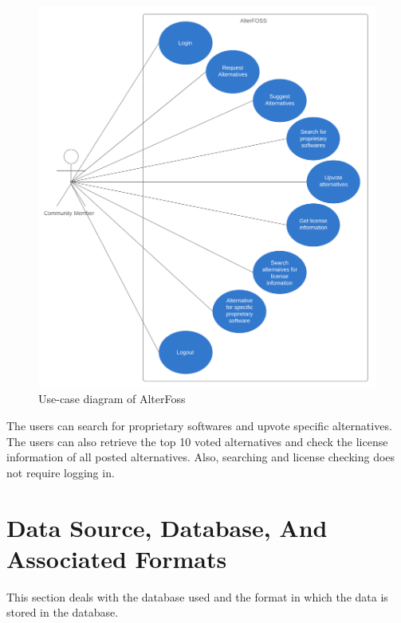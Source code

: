 \begin{figure}[h!]
    \includegraphics[scale=0.8]{images/uml_user.png}
    \caption{Use-case diagram of AlterFoss}
    \label{fig:use_case_diagram}
\end{figure}

The users can search for proprietary softwares and upvote specific alternatives. The users can also retrieve the top 10 voted alternatives and check the license information of all posted alternatives. Also, searching and license checking does not require logging in.



\section{Data Source, Database, And Associated Formats}

This section deals with the database used and the format in which the data is stored in the database.


